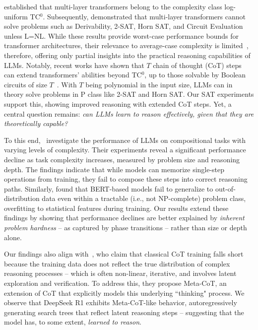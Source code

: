 \documentclass{article} %
\begin{document}
\citet{log_precision_transformers} established that multi-layer transformers belong to the complexity class log-uniform TC$^0$. Subsequently, \citet{limits_of_transformer_architectures} demonstrated that multi-layer transformers cannot solve problems such as Derivability, 2-SAT, Horn SAT, and Circuit Evaluation unless L=NL. While these results provide worst-case performance bounds for transformer architectures, their relevance to average-case complexity is limited~\citep{coarfa2000random}, therefore, offering only partial insights into the practical reasoning capabilities of LLMs. Notably, recent works have shown that $T$ chain of thought (CoT) steps can extend transformers’ abilities beyond TC$^{0}$, up to those solvable by Boolean circuits of size $T$~\citep{cot_complexity}. With $T$ being polynomial in the input size, LLMs can in theory solve problems in P class like 2-SAT and Horn SAT. Our SAT experiments support this, showing improved reasoning with extended CoT steps. Yet, a central question remains: \emph{can LLMs learn to reason effectively, given that they are theoretically capable?}

To this end,~\citet{dziri2023faith} investigate the performance of LLMs on compositional tasks with varying levels of complexity. Their experiments reveal a significant performance decline as task complexity increases, measured by problem size and reasoning depth. The findings indicate that while models can memorize single-step operations from training, they fail to compose these steps into correct reasoning paths. Similarly, \citet{paradox_of_learning_to_reason} found that BERT-based models fail to generalize to out-of-distribution data even within a tractable (i.e., not NP-complete) problem class, overfitting to statistical features during training. Our results extend these findings by showing that performance declines are better explained by \emph{inherent problem hardness} -- as captured by phase transitions -- rather than size or depth alone.

Our findings also align with~\citet{metaCoT}, who claim that classical CoT training falls short because the training data does not reflect the true distribution of complex reasoning processes -- which is often non-linear, iterative, and involves latent exploration and verification. To address this, they propose Meta-CoT, an extension of CoT that explicitly models this underlying ``thinking" process. We observe that DeepSeek R1 exhibits Meta-CoT-like behavior, autoregressively generating search trees that reflect latent reasoning steps -- suggesting that the model has, to some extent, \emph{learned to reason}.
\end{document}
